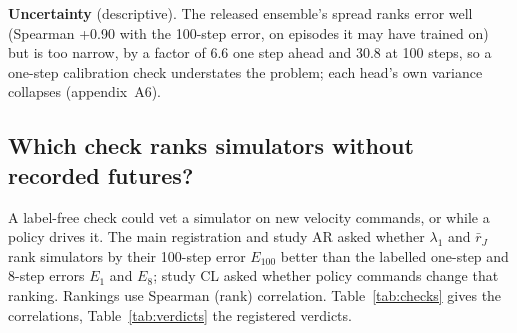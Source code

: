 \textbf{Uncertainty} (descriptive). The released ensemble's spread ranks error well (Spearman +0.90 with
the 100-step error, on episodes it may have trained on) but is too narrow, by a factor of 6.6 one step ahead and
30.8 at 100 steps, so a one-step calibration check understates the problem; each head's own variance collapses (appendix~A6).

\subsection{Which check ranks simulators without recorded futures?}\label{sec:checks}
A label-free check could vet a simulator on new velocity commands, or while a policy drives it. The main registration
and study AR asked whether $\lambda_1$ and $\bar r_J$ rank simulators by their 100-step error $E_{100}$ better than the labelled
one-step and 8-step errors $E_1$ and $E_8$; study CL asked whether policy commands change that ranking. Rankings use Spearman (rank) correlation. Table~\ref{tab:checks} gives the correlations, Table~\ref{tab:verdicts}
the registered verdicts.

\begin{widetable}[t]
\centering
\caption{Spearman correlation of each check with the 100-step error $E_{100}$ under recorded commands, across
simulators (number in brackets). F18, main pool: checks computed with recorded or with the policy's joint commands.
X5: within each split, averaged. Other architectures: F18's split, within each architecture. Closed loop: $\lambda_1$
with the policy differentiated too. --: not applicable. E: exploratory. Correlations are descriptive;
Table~\ref{tab:verdicts} gives the registered tests.}
\label{tab:checks}
\footnotesize
\setlength{\tabcolsep}{4pt}
\end{widetable}

